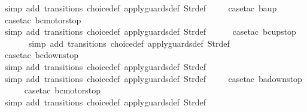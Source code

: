 \begin{isabellebody}
\ {\isacharparenleft}simp\ add{\isacharcolon}\ transitions\ choice{\isacharunderscore}def\ apply{\isacharunderscore}guards{\isacharunderscore}def\ Str{\isacharunderscore}def{\isacharparenright}\isanewline
\ \ \ \isamarkupfalse%
\ {\isacharparenleft}case{\isacharunderscore}tac\ {\isachardoublequoteopen}ba{\isacharequal}up{}{}{\isachardoublequoteclose}{\isacharparenright}\isanewline
\ \ \ \ \isamarkupfalse%
\ {\isacharparenleft}case{\isacharunderscore}tac\ {\isachardoublequoteopen}bc{\isacharequal}motorstop{}{\isachardoublequoteclose}{\isacharparenright}\isanewline
\ \ \ \ \ \isamarkupfalse%
\ {\isacharparenleft}simp\ add{\isacharcolon}\ transitions\ choice{\isacharunderscore}def\ apply{\isacharunderscore}guards{\isacharunderscore}def\ Str{\isacharunderscore}def{\isacharparenright}\isanewline
\ \ \ \ \isamarkupfalse%
\ {\isacharparenleft}case{\isacharunderscore}tac\ {\isachardoublequoteopen}bc{\isacharequal}up{}{}stop{\isachardoublequoteclose}{\isacharparenright}\isanewline
\ \ \ \ \ \isamarkupfalse%
\ {\isacharparenleft}simp\ add{\isacharcolon}\ transitions\ choice{\isacharunderscore}def\ apply{\isacharunderscore}guards{\isacharunderscore}def\ Str{\isacharunderscore}def{\isacharparenright}\isanewline
\ \ \ \ \isamarkupfalse%
\ {\isacharparenleft}case{\isacharunderscore}tac\ {\isachardoublequoteopen}bc{\isacharequal}down{}{}stop{\isachardoublequoteclose}{\isacharparenright}\isanewline
\ \ \ \ \ \isamarkupfalse%
\ {\isacharparenleft}simp\ add{\isacharcolon}\ transitions\ choice{\isacharunderscore}def\ apply{\isacharunderscore}guards{\isacharunderscore}def\ Str{\isacharunderscore}def{\isacharparenright}\isanewline
\ \ \isamarkupfalse%
\ {\isacharparenleft}simp\ add{\isacharcolon}\ transitions\ choice{\isacharunderscore}def\ apply{\isacharunderscore}guards{\isacharunderscore}def\ Str{\isacharunderscore}def{\isacharparenright}\isanewline
\ \ \ \isamarkupfalse%
\ {\isacharparenleft}case{\isacharunderscore}tac\ {\isachardoublequoteopen}ba{\isacharequal}down{}{}stop{\isachardoublequoteclose}{\isacharparenright}\isanewline
\ \ \ \ \isamarkupfalse%
\ {\isacharparenleft}case{\isacharunderscore}tac\ {\isachardoublequoteopen}bc{\isacharequal}motorstop{}{\isachardoublequoteclose}{\isacharparenright}\isanewline
\ \ \ \ \ \isamarkupfalse%
\ {\isacharparenleft}simp\ add{\isacharcolon}\ transitions\ choice{\isacharunderscore}def\ apply{\isacharunderscore}guards{\isacharunderscore}def\ Str{\isacharunderscore}def{\isacharparenright}\isanewline

\end{isabellebody}
